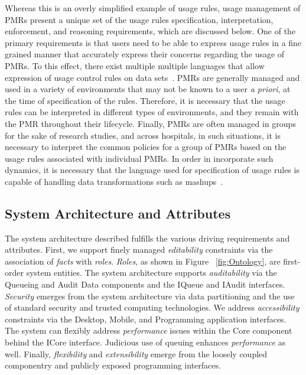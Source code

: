 \documentclass[10pt, conference, compsocconf]{IEEEtran}
\begin{document}
Whereas this is an overly simplified example of usage rules, usage management of PMRs present a unique set of the usage rules specification, interpretation, enforcement, and reasoning requirements, which are discussed below. One of the primary requirements is that users need to be able to express usage rules in a fine grained manner that accurately express their concerns regarding the  usage of PMRs. To this effect, there exist multiple multiple languages that allow expression of usage control rules on data sets~\cite{XrML-spec,PaSa:04,JaHeLa:10}.  PMRs are generally managed and used in a variety of environments that may not be known to a user \textit{a priori}, at the time of specification of the rules. Therefore, it is necessary that the usage rules can be interpreted in different types of environments, and they remain with the PMR throughout their lifecycle. Finally, PMRs are often managed in groups for the sake of research studies, and across hospitals, in such situations, it is necessary to interpret the common policies for a group of PMRs based on the usage rules associated with individual PMRs. In order in incorporate such dynamics, it is necessary that the language used for specification of usage rules is capable of handling data transformations such as mashups~\cite{JaHe:08}. 
 

\subsection{System Architecture and Attributes}
The system architecture described fulfills the various driving requirements and attributes.  First, we support finely managed \textit{editability} constraints via the association of \textit{facts} with \textit{roles}.  \textit{Roles}, as shown in Figure ~\ref{fig:Ontology}, are first-order system entities.  The system architecture supports \textit{auditability} via the Queueing and Audit Data components and the IQueue and IAudit interfaces.  \textit{Security} emerges from the system architecture via data partitioning and the use of standard security and trusted computing technologies.  We address \textit{accessibility} constraints via the Desktop, Mobile, and Programming application interfaces.  The system can flexibly address \textit{performance} issues within the Core component behind the ICore interface.  Judicious use of queuing enhances \textit{performance} as well.  Finally, \textit{flexibility} and \textit{extensibility} emerge from the loosely coupled componentry and publicly exposed programming interfaces.
\end{document}
